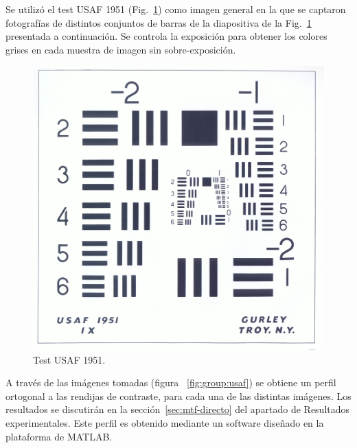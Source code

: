 \documentclass{./packages/optica-article}
\begin{document}
Se utilizó el test USAF 1951 (Fig.~\ref{fig:usaf1951}) como imagen general en la que se captaron fotografías de  distintos conjuntos de barras de la diapositiva de la Fig.~\ref{fig:usaf1951} presentada a continuación. Se controla la exposición para obtener los colores grises en cada muestra de imagen sin sobre-exposición.

\begin{figure}[h]
	\centering
	\includegraphics[scale=0.08]{testusaf1951}
	\caption{Test USAF 1951.}\label{fig:usaf1951}
\end{figure}

A través de las imágenes tomadas (figura ~\ref{fig:group:usaf}) se obtiene un perfil ortogonal a las rendijas de contraste, para cada una de las distintas imágenes. Los resultados se discutirán en la sección~\ref{sec:mtf-directo} del apartado de Resultados experimentales. Este perfil es obtenido mediante un software diseñado en la plataforma de MATLAB.
\end{document}
